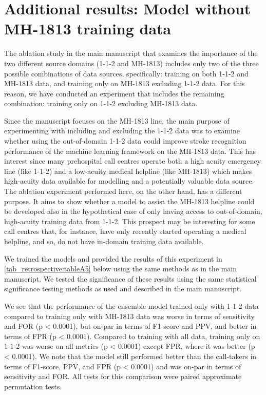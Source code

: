 {\section{Additional results: Model without MH-1813 training data}
%
The ablation study in the main manuscript that examines the importance of the two different source domains (1-1-2 and MH-1813) includes only two of the three possible combinations of data sources, specifically: training on both 1-1-2 and MH-1813 data, and training only on MH-1813 excluding 1-1-2 data. For this reason, we have conducted an experiment that includes the remaining combination: training only on 1-1-2 excluding MH-1813 data.

Since the manuscript focuses on the MH-1813 line, the main purpose of experimenting with including and excluding the 1-1-2 data was to examine whether using the out-of-domain 1-1-2 data could improve stroke recognition performance of the machine learning framework on the MH-1813 data. This has interest since many prehospital call centres operate both a high acuity emergency line (like 1-1-2) and a low-acuity medical helpline (like MH-1813) which makes high-acuity data available for modelling and a potentially valuable data source. The ablation experiment performed here, on the other hand, has a different purpose. It aims to show whether a model to assist the MH-1813 helpline could be developed also in the hypothetical case of only having access to out-of-domain, high-acuity training data from 1-1-2. This prospect may be interesting for some call centres that, for instance, have only recently started operating a medical helpline, and so, do not have in-domain training data available.

We trained the models and provided the results of this experiment in \cref{tab_retrospective:tableA5} below using the same methods as in the main manuscript. We tested the significance of these results using the same statistical significance testing methods as used and described in the main manuscript.

We see that the performance of the ensemble model trained only with 1-1-2 data compared to training only with MH-1813 data was worse in terms of sensitivity and FOR (p < 0.0001), but on-par in terms of F1-score and PPV, and better in terms of FPR (p < 0.0001). Compared to training with all data, training only on 1-1-2 was worse on all metrics (p < 0.0001) except FPR, where it was better (p < 0.0001). We note that the model still performed better than the call-takers in terms of F1-score, PPV, and FPR (p < 0.0001) and was on-par in terms of sensitivity and FOR. All tests for this comparison were paired approximate permutation tests.

}
